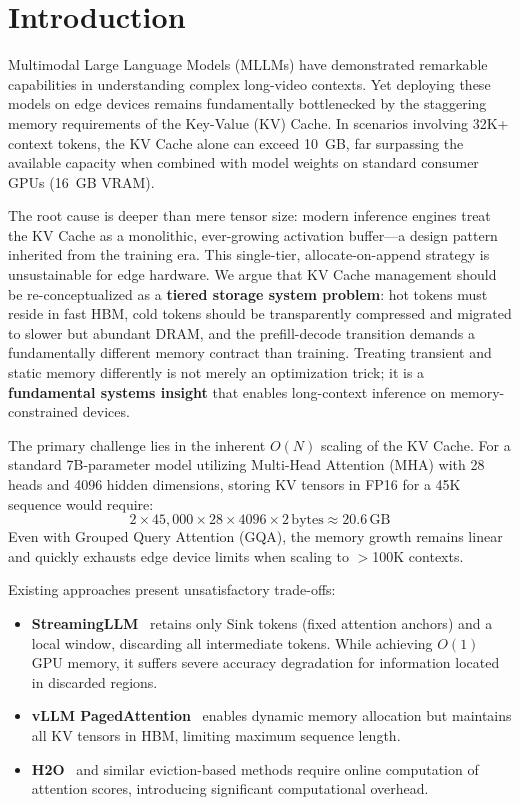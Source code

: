 \section{Introduction}

Multimodal Large Language Models (MLLMs) have demonstrated remarkable capabilities in understanding complex long-video contexts. Yet deploying these models on edge devices remains fundamentally bottlenecked by the staggering memory requirements of the Key-Value (KV) Cache. In scenarios involving 32K+ context tokens, the KV Cache alone can exceed 10~GB, far surpassing the available capacity when combined with model weights on standard consumer GPUs (16~GB VRAM).

The root cause is deeper than mere tensor size: modern inference engines treat the KV Cache as a monolithic, ever-growing activation buffer---a design pattern inherited from the training era. This single-tier, allocate-on-append strategy is unsustainable for edge hardware. We argue that KV Cache management should be re-conceptualized as a \textbf{tiered storage system problem}: hot tokens must reside in fast HBM, cold tokens should be transparently compressed and migrated to slower but abundant DRAM, and the prefill-decode transition demands a fundamentally different memory contract than training. Treating transient and static memory differently is not merely an optimization trick; it is a \textbf{fundamental systems insight} that enables long-context inference on memory-constrained devices.

The primary challenge lies in the inherent $O(N)$ scaling of the KV Cache. For a standard 7B-parameter model utilizing Multi-Head Attention (MHA) with 28 heads and 4096 hidden dimensions, storing KV tensors in FP16 for a 45K sequence would require:
\begin{equation}
2 \times 45{,}000 \times 28 \times 4096 \times 2\,\text{bytes} \approx 20.6\,\text{GB}
\end{equation}
Even with Grouped Query Attention (GQA), the memory growth remains linear and quickly exhausts edge device limits when scaling to $>$100K contexts.

Existing approaches present unsatisfactory trade-offs:
\begin{itemize}
    \item \textbf{StreamingLLM}~\cite{xiao2023streamingllm} retains only Sink tokens (fixed attention anchors) and a local window, discarding all intermediate tokens. While achieving $O(1)$ GPU memory, it suffers severe accuracy degradation for information located in discarded regions.
    \item \textbf{vLLM PagedAttention}~\cite{kwon2023efficient} enables dynamic memory allocation but maintains all KV tensors in HBM, limiting maximum sequence length.
    \item \textbf{H2O}~\cite{zhang2023h2o} and similar eviction-based methods require online computation of attention scores, introducing significant computational overhead.
\end{itemize}

